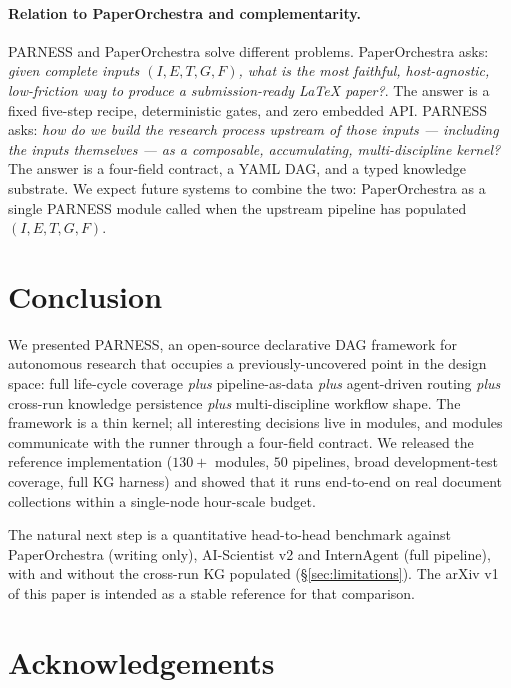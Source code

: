 \documentclass{article}
\newcommand{\parness}{\textsf{PARNESS}}
\begin{document}
\paragraph{Relation to PaperOrchestra and complementarity.}
\parness{} and PaperOrchestra solve different problems. PaperOrchestra
asks: \emph{given complete inputs $(I,E,T,G,F)$, what is the most
faithful, host-agnostic, low-friction way to produce a submission-ready
LaTeX paper?}. The answer is a fixed five-step recipe, deterministic
gates, and zero embedded API. \parness{} asks: \emph{how do we build the
research process upstream of those inputs --- including the inputs
themselves --- as a composable, accumulating, multi-discipline kernel?}
The answer is a four-field contract, a YAML DAG, and a typed knowledge
substrate. We expect future systems to combine the two: PaperOrchestra
as a single \parness{} module called when the upstream pipeline has
populated $(I,E,T,G,F)$.

\section{Conclusion}
\label{sec:conclusion}

We presented \parness{}, an open-source declarative DAG framework for
autonomous research that occupies a previously-uncovered point in the
design space: full life-cycle coverage \emph{plus} pipeline-as-data
\emph{plus} agent-driven routing \emph{plus} cross-run knowledge
persistence \emph{plus} multi-discipline workflow shape. The framework
is a thin kernel; all interesting decisions live in modules, and modules
communicate with the runner through a four-field contract. We released
the reference implementation ($130{+}$ modules, $50$ pipelines, broad
development-test coverage, full KG harness) and showed that it runs
end-to-end on real document collections within a single-node hour-scale
budget.

The natural next step is a quantitative head-to-head benchmark against
PaperOrchestra (writing only), AI-Scientist v2 and InternAgent (full
pipeline), with and without the cross-run KG populated
(\S\ref{sec:limitations}). The arXiv v1 of this paper is intended as a
stable reference for that comparison.

\section*{Acknowledgements}
\end{document}
